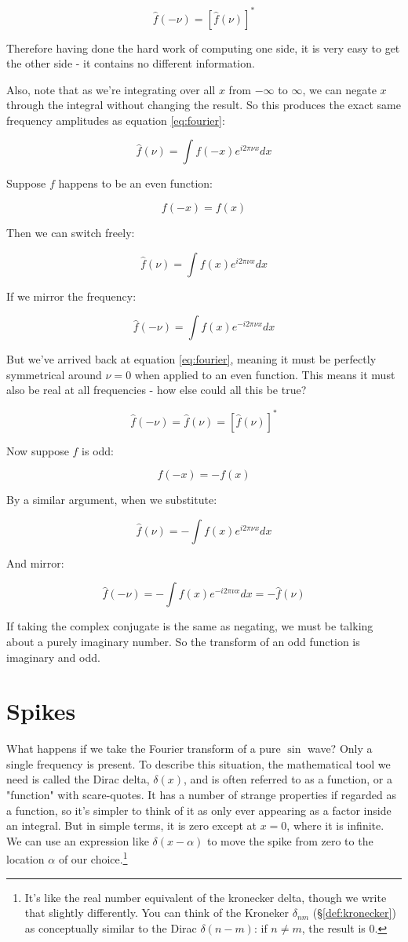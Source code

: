 $$
\hat{f}(-\nu) = \left[ \hat{f}(\nu) \right]^*
$$

Therefore having done the hard work of computing one side, it is very easy to get the other side - it contains no different information.

Also, note that as we're integrating over all $x$ from $-\infty$ to $\infty$, we can negate $x$ through the integral without changing the result. So this produces the exact same frequency amplitudes as equation \eqref{eq:fourier}:

$$\hat{f}(\nu) = \int f(-x)e^{i2\pi\nu x} dx$$

Suppose $f$ happens to be an even function:

$$f(-x) = f(x)$$

Then we can switch freely:

$$\hat{f}(\nu) = \int f(x)e^{i2\pi\nu x} dx$$

If we mirror the frequency:

$$\hat{f}(-\nu) = \int f(x)e^{-i2\pi\nu x} dx$$

But we've arrived back at equation \eqref{eq:fourier}, meaning it must be perfectly symmetrical around $\nu = 0$ when applied to an even function. This means it must also be real at all frequencies - how else could all this be true?

$$
\hat{f}(-\nu) = \hat{f}(\nu) = \left[ \hat{f}(\nu) \right]^*
$$

Now suppose $f$ is odd:

$$f(-x) = -f(x)$$

By a similar argument, when we substitute:

$$
\hat{f}(\nu) = - \int f(x)e^{i2\pi\nu x}
dx
$$

And mirror:

$$
\hat{f}(-\nu) = - \int f(x)e^{-i2\pi\nu x}
dx
= -\hat{f}(\nu)
$$

If taking the complex conjugate is the same as negating, we must be talking about a purely imaginary number. So the transform of an odd function is imaginary and odd.

\section{Spikes} \label{sec:fourier-spike}

What happens if we take the Fourier transform of a pure $\sin$ wave? Only a single frequency is present. To describe this situation, the mathematical tool we need is called the Dirac delta, $\delta(x)$, and is often referred to as a function, or a "function" with scare-quotes. It has a number of strange properties if regarded as a function, so it's simpler to think of it as only ever appearing as a factor inside an integral. But in simple terms, it is zero except at $x = 0$, where it is infinite. We can use an expression like $\delta(x - \alpha)$ to move the spike from zero to the location $\alpha$ of our choice.\footnote{It's like the real number equivalent of the kronecker delta, though we write that slightly differently. You can think of the Kroneker $\delta_{nm}$ (§\ref{def:kronecker}) as conceptually similar to the Dirac $\delta(n - m)$: if $n \ne m$, the result is $0$.}


